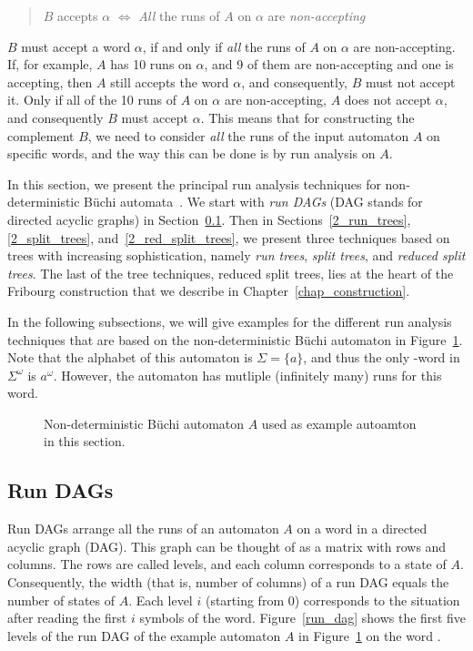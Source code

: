\begin{quote}
\centering
$B$ accepts $\alpha$ $\Longleftrightarrow$ \textit{All} the runs of $A$ on $\alpha$ are \textit{non-accepting}
\end{quote}

$B$ must accept a word $\alpha$, if and only if \textit{all} the runs of $A$ on $\alpha$ are non-accepting. If, for example, $A$ has 10 runs on $\alpha$, and 9 of them are non-accepting and one is accepting, then $A$ still accepts the word $\alpha$, and consequently, $B$ must not accept it. Only if all of the 10 runs of $A$ on $\alpha$ are non-accepting, $A$ does not accept $\alpha$, and consequently $B$ must accept $\alpha$. This means that for constructing the complement $B$, we need to consider \textit{all} the runs of the input automaton $A$ on specific words, and the way this can be done is by run analysis on $A$.

In this section, we present the principal run analysis techniques for non-deterministic Büchi automata~\cite{2014_wilke}. We start with \textit{run DAGs} (DAG stands for directed acyclic graphs) in Section~\ref{2_run_dags}. Then in Sections~\ref{2_run_trees}, \ref{2_split_trees}, and~\ref{2_red_split_trees}, we present three techniques based on trees with increasing sophistication, namely \textit{run trees}, \textit{split trees}, and \textit{reduced split trees}. The last of the tree techniques, reduced split trees, lies at the heart of the Fribourg construction that we describe in Chapter~\ref{chap_construction}.

In the following subsections, we will give examples for the different run analysis techniques that are based on the non-deterministic Büchi automaton in Figure~\ref{ex_aut_1}. Note that the alphabet of this automaton is $\Sigma=\{a\}$, and thus the only \om-word in $\Sigma^\omega$ is $a^\omega$. However, the automaton has mutliple (infinitely many) runs for this word.

\begin{figure}[htb]
\centering
\Automaton
\caption{Non-deterministic Büchi automaton $A$ used as example autoamton in this section.}
\label{ex_aut_1}
\end{figure}


\subsection{Run DAGs}
\label{2_run_dags}
Run DAGs arrange all the runs of an automaton $A$ on a word in a directed acyclic graph (DAG). This graph can be thought of as a matrix with rows and columns. The rows are called levels, and each column corresponds to a state of $A$. Consequently, the width (that is, number of columns) of a run DAG equals the number of states of $A$. Each level $i$ (starting from 0) corresponds to the situation after reading the first $i$ symbols of the word. Figure~\ref{run_dag} shows the first five levels of the run DAG of the example automaton $A$ in Figure~\ref{ex_aut_1} on the word \aom.

